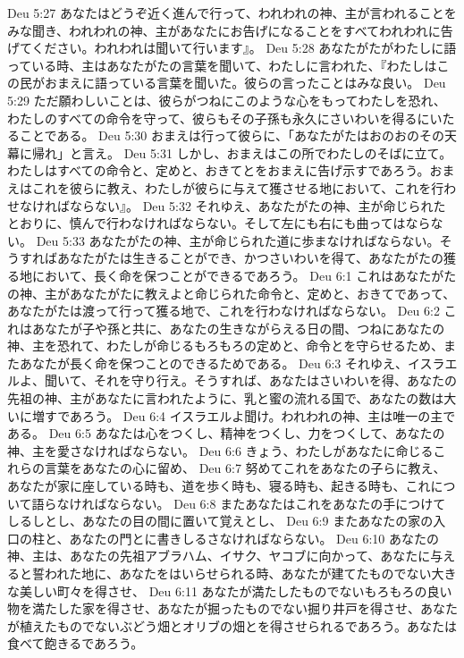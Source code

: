 Deu 5:27  あなたはどうぞ近く進んで行って、われわれの神、主が言われることをみな聞き、われわれの神、主があなたにお告げになることをすべてわれわれに告げてください。われわれは聞いて行います』。
Deu 5:28  あなたがたがわたしに語っている時、主はあなたがたの言葉を聞いて、わたしに言われた、『わたしはこの民がおまえに語っている言葉を聞いた。彼らの言ったことはみな良い。
Deu 5:29  ただ願わしいことは、彼らがつねにこのような心をもってわたしを恐れ、わたしのすべての命令を守って、彼らもその子孫も永久にさいわいを得るにいたることである。
Deu 5:30  おまえは行って彼らに、「あなたがたはおのおのその天幕に帰れ」と言え。
Deu 5:31  しかし、おまえはこの所でわたしのそばに立て。わたしはすべての命令と、定めと、おきてとをおまえに告げ示すであろう。おまえはこれを彼らに教え、わたしが彼らに与えて獲させる地において、これを行わせなければならない』。
Deu 5:32  それゆえ、あなたがたの神、主が命じられたとおりに、慎んで行わなければならない。そして左にも右にも曲ってはならない。
Deu 5:33  あなたがたの神、主が命じられた道に歩まなければならない。そうすればあなたがたは生きることができ、かつさいわいを得て、あなたがたの獲る地において、長く命を保つことができるであろう。
Deu 6:1  これはあなたがたの神、主があなたがたに教えよと命じられた命令と、定めと、おきてであって、あなたがたは渡って行って獲る地で、これを行わなければならない。
Deu 6:2  これはあなたが子や孫と共に、あなたの生きながらえる日の間、つねにあなたの神、主を恐れて、わたしが命じるもろもろの定めと、命令とを守らせるため、またあなたが長く命を保つことのできるためである。
Deu 6:3  それゆえ、イスラエルよ、聞いて、それを守り行え。そうすれば、あなたはさいわいを得、あなたの先祖の神、主があなたに言われたように、乳と蜜の流れる国で、あなたの数は大いに増すであろう。
Deu 6:4  イスラエルよ聞け。われわれの神、主は唯一の主である。
Deu 6:5  あなたは心をつくし、精神をつくし、力をつくして、あなたの神、主を愛さなければならない。
Deu 6:6  きょう、わたしがあなたに命じるこれらの言葉をあなたの心に留め、
Deu 6:7  努めてこれをあなたの子らに教え、あなたが家に座している時も、道を歩く時も、寝る時も、起きる時も、これについて語らなければならない。
Deu 6:8  またあなたはこれをあなたの手につけてしるしとし、あなたの目の間に置いて覚えとし、
Deu 6:9  またあなたの家の入口の柱と、あなたの門とに書きしるさなければならない。
Deu 6:10  あなたの神、主は、あなたの先祖アブラハム、イサク、ヤコブに向かって、あなたに与えると誓われた地に、あなたをはいらせられる時、あなたが建てたものでない大きな美しい町々を得させ、
Deu 6:11  あなたが満たしたものでないもろもろの良い物を満たした家を得させ、あなたが掘ったものでない掘り井戸を得させ、あなたが植えたものでないぶどう畑とオリブの畑とを得させられるであろう。あなたは食べて飽きるであろう。
